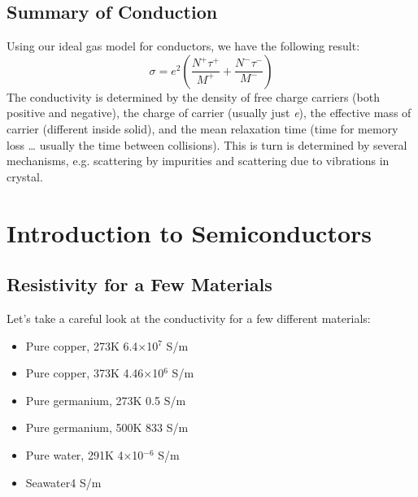 \subsection{Summary of Conduction}
Using our ideal gas model for conductors, we have the following result:
    \begin{equation}
        \sigma = {e^2}\left( {\frac{{{N^ + }{\tau ^ + }}}{{{M^ + }}} + \frac{{{N^ - }{\tau ^ - }}}{{{M^ - }}}} \right)
    \end{equation}
The conductivity is determined by the density of free charge carriers (both positive and negative), the charge of carrier (usually just \textit{e}), the effective mass of carrier (different inside solid), and the mean relaxation time (time for memory loss … usually the time between collisions).   This is turn is determined by several mechanisms, e.g. scattering by impurities and scattering due to vibrations in crystal.
\newpage
\section{Introduction to Semiconductors}
\subsection{Resistivity for a Few Materials}
Let's take a careful look at the conductivity for a few different materials:

\vspace{.35cm}
    \begin{minipage}[c]{.55\textwidth}
        \begin{itemize}
            \item{Pure copper, 273K \hfill 6.4×10$^{7}$ S/m}
            \item{Pure copper, 373K \hfill 4.46×10$^{6}$ S/m}
            \item{Pure germanium, 273K \hfill 0.5  S/m}
            \item{Pure germanium, 500K \hfill 833 S/m}
            \item{Pure water, 291K \hfill 4×10$^{-6}$ S/m}
            \item{Seawater\hfill 4 S/m}
        \end{itemize}
    \end{minipage}
\vspace{.45cm}

